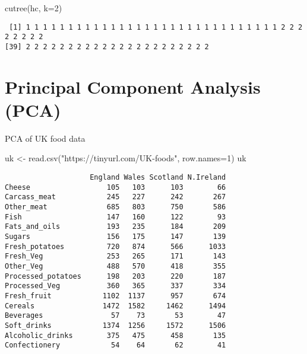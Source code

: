 \documentclass[
  letterpaper,
  DIV=11,
  numbers=noendperiod]{scrartcl}
\newenvironment{Shaded}{\begin{snugshade}}{\end{snugshade}}
\newcommand{\AttributeTok}[1]{\textcolor[rgb]{0.40,0.45,0.13}{#1}}
\newcommand{\DecValTok}[1]{\textcolor[rgb]{0.68,0.00,0.00}{#1}}
\newcommand{\FunctionTok}[1]{\textcolor[rgb]{0.28,0.35,0.67}{#1}}
\newcommand{\NormalTok}[1]{\textcolor[rgb]{0.00,0.23,0.31}{#1}}
\newcommand{\OtherTok}[1]{\textcolor[rgb]{0.00,0.23,0.31}{#1}}
\newcommand{\StringTok}[1]{\textcolor[rgb]{0.13,0.47,0.30}{#1}}
\begin{document}
\begin{Shaded}
\begin{Highlighting}[]
\FunctionTok{cutree}\NormalTok{(hc, }\AttributeTok{k=}\DecValTok{2}\NormalTok{)}
\end{Highlighting}
\end{Shaded}

\begin{verbatim}
 [1] 1 1 1 1 1 1 1 1 1 1 1 1 1 1 1 1 1 1 1 1 1 1 1 1 1 1 1 1 1 1 2 2 2 2 2 2 2 2
[39] 2 2 2 2 2 2 2 2 2 2 2 2 2 2 2 2 2 2 2 2 2 2
\end{verbatim}

\hypertarget{principal-component-analysis-pca}{%
\section{Principal Component Analysis
(PCA)}\label{principal-component-analysis-pca}}

PCA of UK food data

\begin{Shaded}
\begin{Highlighting}[]
\NormalTok{uk }\OtherTok{\textless{}{-}} \FunctionTok{read.csv}\NormalTok{(}\StringTok{"https://tinyurl.com/UK{-}foods"}\NormalTok{, }\AttributeTok{row.names=}\DecValTok{1}\NormalTok{)}
\NormalTok{uk}
\end{Highlighting}
\end{Shaded}

\begin{verbatim}
                    England Wales Scotland N.Ireland
Cheese                  105   103      103        66
Carcass_meat            245   227      242       267
Other_meat              685   803      750       586
Fish                    147   160      122        93
Fats_and_oils           193   235      184       209
Sugars                  156   175      147       139
Fresh_potatoes          720   874      566      1033
Fresh_Veg               253   265      171       143
Other_Veg               488   570      418       355
Processed_potatoes      198   203      220       187
Processed_Veg           360   365      337       334
Fresh_fruit            1102  1137      957       674
Cereals                1472  1582     1462      1494
Beverages                57    73       53        47
Soft_drinks            1374  1256     1572      1506
Alcoholic_drinks        375   475      458       135
Confectionery            54    64       62        41
\end{verbatim}
\end{document}

